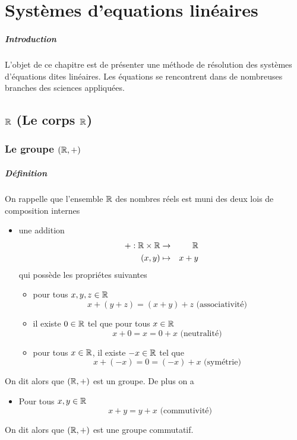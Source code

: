 \chapter{Systèmes d'equations linéaires}

\paragraph{Introduction} L'objet de ce chapitre est de présenter une méthode de résolution des systèmes d'équations dites linéaires. Les équations se rencontrent dans de nombreuses branches des sciences appliquées.
%
%
\section{$\mathbb{R}$ (Le corps $\mathbb{R}$)}
%
%
%
\subsection{Le groupe $(\mathbb{R}, +)$}
%
\paragraph{Définition} On rappelle que l'ensemble $\mathbb{R}$ des nombres réels est muni des deux lois de composition internes
\begin{itemize}
  \item une addition 
    \begin{eqnarray*}
      +: \mathbb{R} \times \mathbb{R} &\rightarrow& \mathbb{R} \\
      (x, y) &\mapsto& x+y
    \end{eqnarray*}
    qui possède les propriétes suivantes
    \begin{itemize}
      \item pour tous $x, y, z \in \mathbb{R}$
        $$x + (y + z) = (x + y) + z \text{ (associativité) }$$
      \item il existe $0 \in \mathbb{R}$ tel que pour tous $x \in \mathbb{R}$
        $$x + 0 = x = 0 + x \text{ (neutralité) }$$
      \item pour tous $x \in \mathbb{R}$, il existe $-x \in \mathbb{R}$ tel que
        $$x + (-x) = 0 = (-x) + x \text{ (symétrie) }$$
    \end{itemize}
\end{itemize}
On dit alors que $(\mathbb{R}, +)$ est un groupe. De plus on a
\begin{itemize}
  \item Pour tous $x, y \in \mathbb{R}$
    $$x + y = y + x \text{ (commutivité) }$$
\end{itemize}
On dit alors que $(\mathbb{R}, +)$ est une groupe commutatif.

